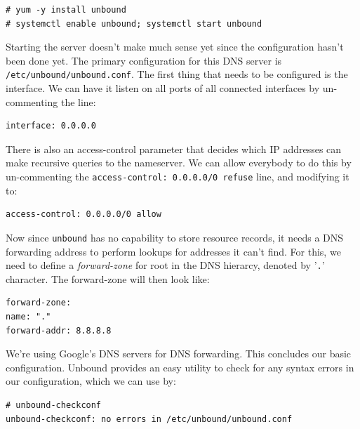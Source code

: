 \vspace{-15pt}
\begin{verbatim}
# yum -y install unbound
# systemctl enable unbound; systemctl start unbound
\end{verbatim}
\vspace{-10pt}	

\noindent
Starting the server doesn't make much sense yet since the configuration hasn't been done yet. The primary configuration for this DNS server is \verb|/etc/unbound/unbound.conf|. The first thing that needs to be configured is the interface. We can have it listen on all ports of all connected interfaces by un-commenting the line:

\vspace{-15pt}
\begin{verbatim}
interface: 0.0.0.0
\end{verbatim}
\vspace{-10pt}	

\noindent
There is also an access-control parameter that decides which IP addresses can make recursive queries to the nameserver. We can allow everybody to do this by un-commenting the \verb|access-control: 0.0.0.0/0 refuse| line, and modifying it to:

\vspace{-15pt}
\begin{verbatim}
access-control: 0.0.0.0/0 allow
\end{verbatim}
\vspace{-10pt}	

\noindent
Now since \verb|unbound| has no capability to store resource records, it needs a DNS forwarding address to perform lookups for addresses it can't find. For this, we need to define a \textit{forward-zone} for root in the DNS hierarcy, denoted by '\verb|.|' character. The forward-zone will then look like:

\vspace{-15pt}
\begin{verbatim}
forward-zone:
name: "."
forward-addr: 8.8.8.8
\end{verbatim}
\vspace{-10pt}	

\noindent
We're using Google's DNS servers for DNS forwarding. This concludes our basic configuration. Unbound provides an easy utility to check for any syntax errors in our configuration, which we can use by:

\vspace{-15pt}
\begin{verbatim}
# unbound-checkconf
unbound-checkconf: no errors in /etc/unbound/unbound.conf
\end{verbatim}
\vspace{-10pt}	

